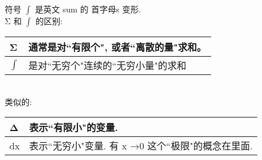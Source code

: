 \documentclass[UTF8]{ctexart}
\begin{document}
	
	符号 $\int$ 是英文 sum 的 首字母s 变形. \\
	
	
	
	Σ 和 $\int$ 的区别: 
	
	\begin{tabular}{|l| l| }
		\hline
		Σ &  通常是对``有限个", 或者``离散的量"求和。 \\
		\hline
		$\int$ & 是对``无穷个"连续的``无穷小量"的求和 \\
		\hline
	\end{tabular} \\

	类似的:
	
	\begin{tabular}{|l| l| }
		\hline
		Δ & 表示``有限小"的变量. \\
		\hline
		dx & 表示``无穷小"变量. 有 x →0 这个``极限"的概念在里面. \\
		\hline
	\end{tabular}





	


	
	
	
	
	
	
	
	
		
	
\end{document}
